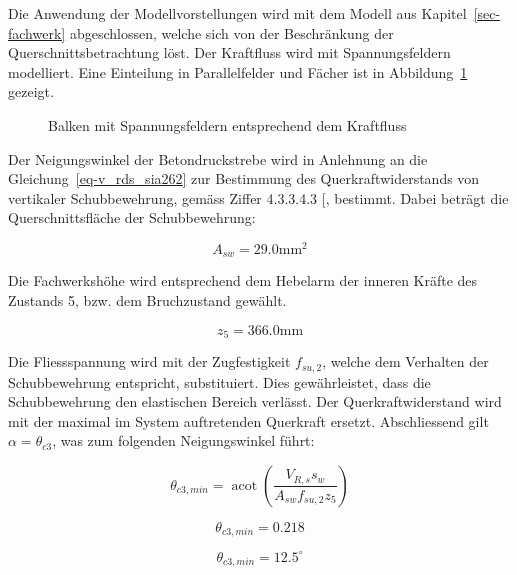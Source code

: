 \documentclass[
  12pt,
  letterpaper,
  egregdoesnotlikesansseriftitles]{scrreprt}
\begin{document}
Die Anwendung der Modellvorstellungen wird mit dem Modell aus
Kapitel~\ref{sec-fachwerk} abgeschlossen, welche sich von der
Beschränkung der Querschnittsbetrachtung löst. Der Kraftfluss wird mit
Spannungsfeldern modelliert. Eine Einteilung in Parallelfelder und
Fächer ist in Abbildung~\ref{fig-spannungsfelder_sv14} gezeigt.

\begin{figure}[H]


\caption{\label{fig-spannungsfelder_sv14}Balken mit Spannungsfeldern
entsprechend dem Kraftfluss}

\end{figure}%

Der Neigungswinkel der Betondruckstrebe wird in Anlehnung an die
Gleichung~\ref{eq-v_rds_sia262} zur Bestimmung des Querkraftwiderstands
von vertikaler Schubbewehrung, gemäss Ziffer 4.3.3.4.3
{[}\citeproc{ref-SIA2013a}{6}{]}, bestimmt. Dabei beträgt die
Querschnittsfläche der Schubbewehrung:

\begin{equation}A_{s w} = 29.0 \text{mm}^{2}\end{equation}

Die Fachwerkshöhe wird entsprechend dem Hebelarm der inneren Kräfte des
Zustands 5, bzw. dem Bruchzustand gewählt.

\begin{equation}z_{5} = 366.0 \text{mm}\end{equation}

Die Fliessspannung wird mit der Zugfestigkeit \(f_{su,2}\), welche dem
Verhalten der Schubbewehrung entspricht, substituiert. Dies
gewährleistet, dass die Schubbewehrung den elastischen Bereich verlässt.
Der Querkraftwiderstand wird mit der maximal im System auftretenden
Querkraft ersetzt. Abschliessend gilt \(\alpha = \theta_{c3}\), was zum
folgenden Neigungswinkel führt:

\begin{equation}\theta_{c3,min} = \operatorname{acot}{\left(\frac{V_{R,s} s_{w}}{A_{s w} f_{su,2} z_{5}} \right)}\end{equation}

\begin{equation}\theta_{c3,min} = 0.218\end{equation}

\begin{equation}\theta_{c3,min} = 12.5 ^\circ\end{equation}
\end{document}
